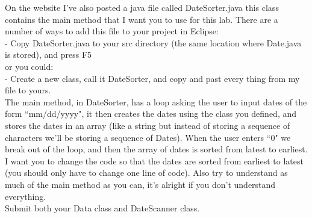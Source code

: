 \documentclass{article}
\begin{document}
On the website I've also posted a java file called DateSorter.java this class contains the main method that I want you to use for this lab. There are a number of ways to add this file to your project in Eclipse:\\

- Copy DateSorter.java to your src directory (the same location where Date.java is stored), and press F5\\

or you could:\\

- Create a new class, call it DateSorter, and copy and past every thing from my file to yours.\\

The main method, in DateSorter, has a loop asking the user to input dates of the form ``mm/dd/yyyy", it then creates the dates using the class you defined, and stores the dates in an array (like a string but instead of storing a sequence of characters we'll be storing a sequence of Dates). When the user enters ``0" we break out of the loop, and then the array of dates is sorted from latest to earliest. I want you to change the code so that the dates are sorted from earliest to latest (you should only have to change one line of code). Also try to understand as much of the main method as you can, it's alright if you don't understand everything.\\

Submit both your Data class and DateScanner class.
\end{document}

